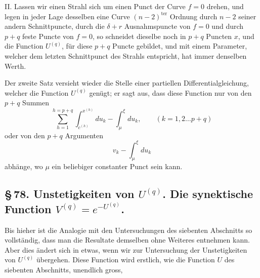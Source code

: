 \documentclass[10pt]{article}
\begin{document}
II. Lassen wir einen Strahl sich um einen Punct der Curve \(f=0\) drehen, und legen in jeder Lage desselben eine Curve \((n-2)^{\mathrm{ter}}\) Ordnung durch \(n-2\) seiner andern Schnittpuncte, durch die \(\delta+r\) Ausnahmspuncte von \(f=0\) und durch \(p+q\) feste Puncte von \(f=0\), so schneidet dieselbe noch in \(p+q\) Puncten \(x\), und die Function \(U^{(q)}\), für diese \(p+q\) Puncte gebildet, und mit einem Parameter, welcher dem letzten Schnittpunct des Strahls entspricht, hat immer denselben Werth.

Der zweite Satz versieht wieder die Stelle einer partiellen Differentialgleichung, welcher die Function \(U^{(q)}\) genügt; er sagt aus, dass diese Function nur von den \(p+q\) Summen
\[
\sum_{h=1}^{h=p+q}\int_{c^{(h)}}^{x^{(h)}}du_k-\int_{\mu}^{\xi}du_k,
\qquad (k=1,2\ldots p+q)
\]
oder von den \(p+q\) Argumenten
\[
v_k-\int_{\mu}^{\xi}du_k
\]
abhänge, wo \(\mu\) ein beliebiger constanter Punct sein kann.

\subsection*{\S\,78. Unstetigkeiten von \(U^{(q)}\). Die synektische Function \(V^{(q)}=e^{-U^{(q)}}\).}

Bis hieher ist die Analogie mit den Untersuchungen des siebenten Abschnitts so vollständig, dass man die Resultate demselben ohne Weiteres entnehmen kann. Aber dies ändert sich in etwas, wenn wir zur Untersuchung der Unstetigkeiten von \(U^{(q)}\) übergehen. Diese Function wird erstlich, wie die Function \(U\) des siebenten Abschnitts, unendlich gross,
\end{document}
